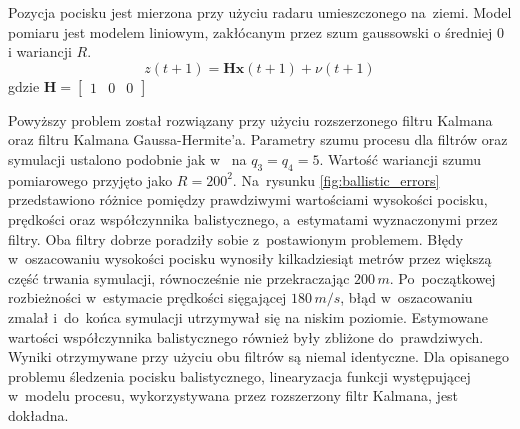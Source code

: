 Pozycja pocisku jest mierzona przy użyciu radaru umieszczonego na~ziemi. Model pomiaru jest modelem liniowym, zakłócanym przez szum gaussowski o średniej $0$ i wariancji $R$.
\begin{equation}
z(t+1) = \boldsymbol{H}\boldsymbol{x}(t+1) + \nu(t+1)
\end{equation}
gdzie $\boldsymbol{H} = \begin{bmatrix}
1 & 0 & 0
\end{bmatrix}$ \par
Powyższy problem został rozwiązany przy użyciu rozszerzonego filtru Kalmana oraz filtru Kalmana Gaussa-Hermite'a. Parametry szumu procesu dla filtrów oraz symulacji ustalono podobnie jak w~\cite{MisslieTracking1} na $q_3=q_4=5$. Wartość wariancji szumu pomiarowego przyjęto jako $R=200^2$. Na~rysunku \ref{fig:ballistic_errors} przedstawiono różnice pomiędzy prawdziwymi wartościami wysokości pocisku, prędkości oraz współczynnika balistycznego, a~estymatami wyznaczonymi przez filtry. Oba filtry dobrze poradziły sobie z~postawionym problemem. Błędy w~oszacowaniu wysokości pocisku wynosiły kilkadziesiąt metrów przez większą część trwania symulacji, równocześnie nie przekraczając $200\,m$. Po~początkowej rozbieżności w~estymacie prędkości sięgającej $180\, m/s$, błąd w~oszacowaniu zmalał i~do~końca symulacji utrzymywał się na niskim poziomie. Estymowane wartości współczynnika balistycznego również były zbliżone do~prawdziwych. Wyniki otrzymywane przy użyciu obu filtrów są niemal identyczne. Dla opisanego problemu śledzenia pocisku balistycznego, linearyzacja funkcji występującej w~modelu procesu, wykorzystywana przez rozszerzony filtr Kalmana, jest dokładna.
